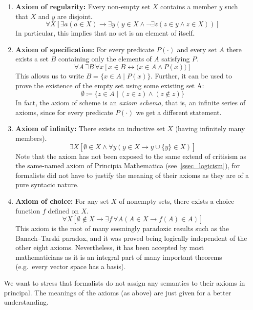 \documentclass[hidelinks]{article}
\theoremstyle{plain}
\theoremstyle{definition}
\theoremstyle{rem}
\begin{document}
\begin{enumerate}
    \item \textbf{Axiom of regularity:} Every non-empty set $X$ contains a member $y$ such that $X$ and $y$ are disjoint.
\begin{equation*}
\forall X [\exists a ( a \in X) \rightarrow \exists y ( y \in X \land \lnot \exists z (z \in y \land z \in X))]
\end{equation*}
In particular, this implies that no set is an element of itself.
    \item \textbf{Axiom of specification:} For every predicate $P(\cdot)$ and every set $A$ there exists a set $B$ containing only the elements of $A$ satisfying $P$.
\begin{equation*}
\forall A\,\exists B\,\forall x[x\in B \leftrightarrow \bigl(x\in A \land P(x)\bigr)]
\end{equation*}
This allows us to write $B=\{x\in A\mid P(x)\}$. Further, it can be used to prove the existence of the empty set using some existing set A:
\begin{equation*}
\emptyset\coloneqq\{z\in A\mid (z\in z)\land(z\notin z)\}
\end{equation*}
In fact, the axiom of scheme is an \textit{axiom schema}, that is, an infinite series of axioms, since for every predicate $P(\cdot)$ we get a different statement.
    \item \textbf{Axiom of infinity:} There exists an inductive set $X$ (having infinitely many members).
\begin{equation*}
\exists X \left [\emptyset \in X \land \forall y (y \in X \rightarrow y\cup\{y\}  \in X)\right]
\end{equation*}
Note that the axiom has not been exposed to the same extend of critisism as the same-named axiom of Principia Mathematica (see~\ref{ssec_logicism}), for formalists did not have to justify the meaning of their axioms as they are of a pure syntacic nature.
    \item \textbf{Axiom of choice:} For any set $X$ of nonempty sets, there exists a choice function $f$ defined on $X$. 
\begin{equation*}
\forall X \left[ \emptyset \notin X \rightarrow \exists f\,\forall A(A\in X\rightarrow f(A) \in A ) \right]
\end{equation*}
This axiom is the root of many seemingly paradoxic results such as the Banach–Tarski paradox, and it was proved being logically independent of the other eight axioms. Nevertheless, it has been accepted by most mathematicians as it is an integral part of many important theorems (e.g.\ every vector space has a basis).
\end{enumerate}
\normalsize
We want to stress that formalists do not assign any semantics to their axioms in principal. The meanings of the axioms (as above) are just given for a better understanding.
\end{document}

